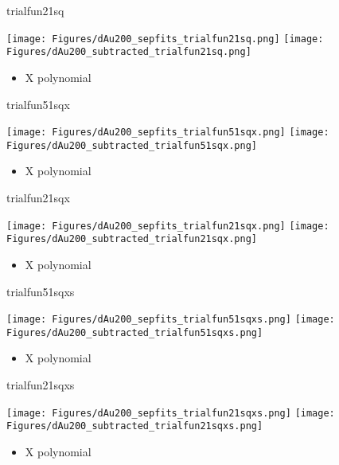 \documentclass[aspectratio=169,compress,10pt]{beamer}
\begin{document}
\begin{frame}{trialfun21sq}
\begin{center}
\texttt{[image: Figures/dAu200\_sepfits\_trialfun21sq.png]}
\texttt{[image: Figures/dAu200\_subtracted\_trialfun21sq.png]}
\end{center}
\begin{itemize}
\item X polynomial
\end{itemize}
\end{frame}


\begin{frame}{trialfun51sqx}
\begin{center}
\texttt{[image: Figures/dAu200\_sepfits\_trialfun51sqx.png]}
\texttt{[image: Figures/dAu200\_subtracted\_trialfun51sqx.png]}
\end{center}
\begin{itemize}
\item X polynomial
\end{itemize}
\end{frame}


\begin{frame}{trialfun21sqx}
\begin{center}
\texttt{[image: Figures/dAu200\_sepfits\_trialfun21sqx.png]}
\texttt{[image: Figures/dAu200\_subtracted\_trialfun21sqx.png]}
\end{center}
\begin{itemize}
\item X polynomial
\end{itemize}
\end{frame}


\begin{frame}{trialfun51sqxs}
\begin{center}
\texttt{[image: Figures/dAu200\_sepfits\_trialfun51sqxs.png]}
\texttt{[image: Figures/dAu200\_subtracted\_trialfun51sqxs.png]}
\end{center}
\begin{itemize}
\item X polynomial
\end{itemize}
\end{frame}


\begin{frame}{trialfun21sqxs}
\begin{center}
\texttt{[image: Figures/dAu200\_sepfits\_trialfun21sqxs.png]}
\texttt{[image: Figures/dAu200\_subtracted\_trialfun21sqxs.png]}
\end{center}
\begin{itemize}
\item X polynomial
\end{itemize}
\end{frame}
\end{document}
